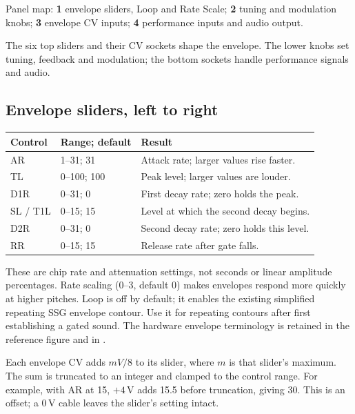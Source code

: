 Panel map: \textbf{1} envelope sliders, Loop and Rate Scale;
\textbf{2} tuning and modulation knobs;
\textbf{3} envelope CV inputs;
\textbf{4} performance inputs and audio output.

The six top sliders and their CV sockets shape the envelope. The lower knobs
set tuning, feedback and modulation; the bottom sockets handle performance
signals and audio.

\subsection{Envelope sliders, left to right}
\begin{tabularx}{\textwidth}{@{}l l X@{}}
\toprule Control & Range; default & Result \\\midrule
AR & 1--31; 31 & Attack rate; larger values rise faster. \\
TL & 0--100; 100 & Peak level; larger values are louder. \\
D1R & 0--31; 0 & First decay rate; zero holds the peak. \\
SL / T1L & 0--15; 15 & Level at which the second decay begins. \\
D2R & 0--31; 0 & Second decay rate; zero holds this level. \\
RR & 0--15; 15 & Release rate after gate falls. \\
\bottomrule
\end{tabularx}

These are chip rate and attenuation settings, not seconds or linear amplitude
percentages. Rate scaling (0--3, default 0) makes envelopes respond more quickly
at higher pitches. Loop is off by default; it enables the existing simplified repeating
SSG envelope contour. Use it for repeating contours after first establishing a gated sound.
The hardware envelope terminology is retained in the reference figure and
in \citet{genesis-sound-software-manual}.

Each envelope CV adds $mV/8$ to its slider, where $m$ is that slider's maximum.
The sum is truncated to an integer and clamped to the control range. For
example, with AR at 15, $+4$\,V adds 15.5 before truncation, giving 30.
This is an offset; a 0\,V cable leaves the slider's setting intact.
